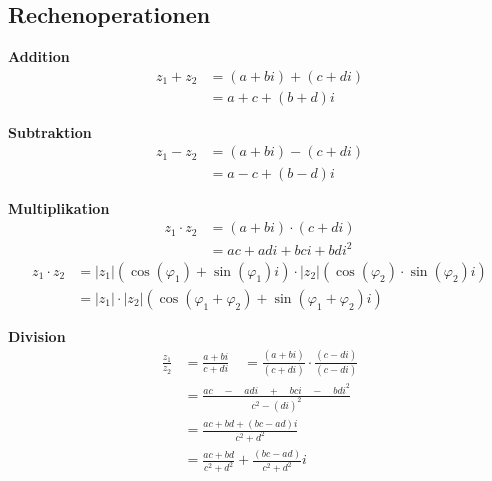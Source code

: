 \documentclass[german]{latex4ei/latex4ei_sheet}
\begin{document}
\begin{sectionbox}

\subsection{Rechenoperationen}
\begin{minipage}{0.49\textwidth}
	\textbf{Addition}
\begin{align*}
	 { z }_{ 1 } + { z }_{ 2 } &= \left(a + bi\right) + \left(c + di \right)\\
	 &= a + c + (b + d)i
	\end{align*}
\end{minipage}
\begin{minipage}{0.49\textwidth}
	\textbf{Subtraktion}
	\begin{align*}
	 { z }_{ 1 } - { z }_{ 2 } &= \left(a + bi \right) - \left(c + di \right)\\
	 &= a - c + (b - d)i
	\end{align*}
\end{minipage}

\textbf{Multiplikation}
\begin{align*}
	 { z }_{ 1 } \cdot  { z }_{ 2 } &= \left(a + bi \right) \cdot \left(c + di \right) \\
	 &= ac + adi + bci + bd { i }^{ 2 }
	\end{align*}
	\begin{align*}
	{ z }_{ 1 }\cdot { z }_{ 2 } & =\left| { z }_{ 1 } \right| \left( \cos { \left( { \varphi  }_{ 1 } \right)  } +\sin { \left( { \varphi  }_{ 1 } \right)  } i \right) \cdot \left| { z }_{ 2 } \right| \left( \cos { \left( { \varphi  }_{ 2 } \right)  } \cdot \sin { \left( { \varphi  }_{ 2 } \right)  } i \right) \\ 
	& =\left| { z }_{ 1 } \right| \cdot \left| { z }_{ 2 } \right| \left( \cos { \left( { \varphi  }_{ 1 } + { \varphi  }_{ 2 } \right)  } +\sin { \left( { \varphi  }_{ 1 } + { \varphi  }_{ 2 } \right)  } i \right)
	\end{align*}

\textbf{Division}
\begin{align*}
\frac { z_{ 1 } }{ z_{ 2 } } &=\frac { a+bi }{ c+di } \quad =\frac { \left( a+bi \right)  }{ \left( c+di \right)  } \cdot \frac { \left( c-di \right)  }{ \left( c-di \right)  } \\ 
&=\frac { ac\quad -\quad adi\quad +\quad bci\quad -\quad bd{ i }^{ 2 } }{ { c }^{ 2 }-{ \left( di \right)  }^{ 2 } } \\ 
&=\frac { ac+bd+\left( bc-ad \right) i }{ { c }^{ 2 }+{ d }^{ 2 } } \\ 
&=\frac { ac+bd }{ { c }^{ 2 }+{ d }^{ 2 } } +\frac { \left( bc-ad \right)  }{ { c }^{ 2 }+{ d }^{ 2 } }  i
\end{align*}


\end{sectionbox}
\end{document}
